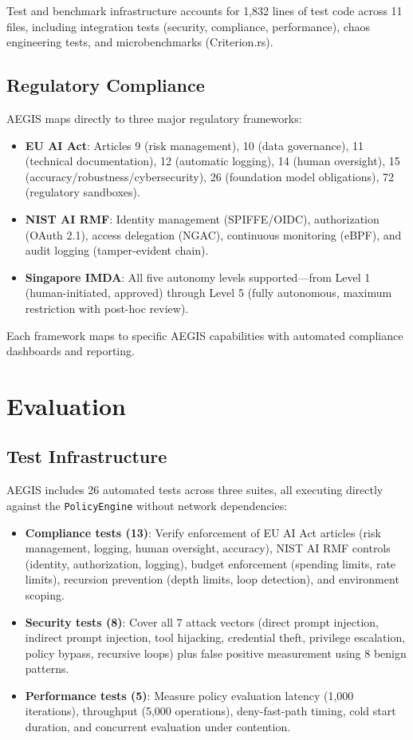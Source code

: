 \documentclass[runningheads]{llncs}
\begin{document}
Test and benchmark infrastructure accounts for 1,832 lines of test code across 11 files, including integration tests (security, compliance, performance), chaos engineering tests, and microbenchmarks (Criterion.rs).

\subsection{Regulatory Compliance}

AEGIS maps directly to three major regulatory frameworks:

\begin{itemize}
\item \textbf{EU AI Act}: Articles 9 (risk management), 10 (data governance), 11 (technical documentation), 12 (automatic logging), 14 (human oversight), 15 (accuracy/robustness/cybersecurity), 26 (foundation model obligations), 72 (regulatory sandboxes).
\item \textbf{NIST AI RMF}: Identity management (SPIFFE/OIDC), authorization (OAuth 2.1), access delegation (NGAC), continuous monitoring (eBPF), and audit logging (tamper-evident chain).
\item \textbf{Singapore IMDA}: All five autonomy levels supported---from Level 1 (human-initiated, approved) through Level 5 (fully autonomous, maximum restriction with post-hoc review).
\end{itemize}

Each framework maps to specific AEGIS capabilities with automated compliance dashboards and reporting.

\section{Evaluation}

\subsection{Test Infrastructure}

AEGIS includes 26 automated tests across three suites, all executing directly against the \texttt{PolicyEngine} without network dependencies:

\begin{itemize}
\item \textbf{Compliance tests (13)}: Verify enforcement of EU AI Act articles (risk management, logging, human oversight, accuracy), NIST AI RMF controls (identity, authorization, logging), budget enforcement (spending limits, rate limits), recursion prevention (depth limits, loop detection), and environment scoping.
\item \textbf{Security tests (8)}: Cover all 7 attack vectors (direct prompt injection, indirect prompt injection, tool hijacking, credential theft, privilege escalation, policy bypass, recursive loops) plus false positive measurement using 8 benign patterns.
\item \textbf{Performance tests (5)}: Measure policy evaluation latency (1,000 iterations), throughput (5,000 operations), deny-fast-path timing, cold start duration, and concurrent evaluation under contention.
\end{itemize}
\end{document}
